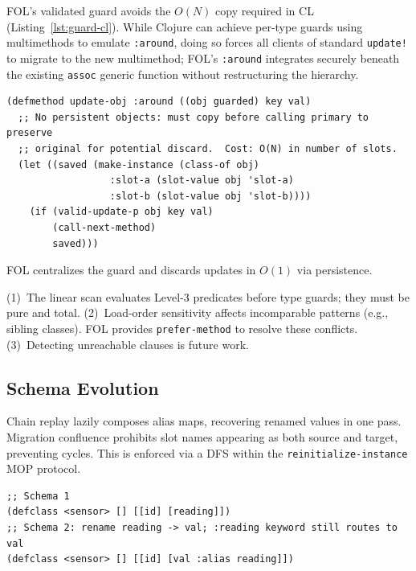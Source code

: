 \documentclass[sigconf,nonacm]{acmart}
\begin{document}
FOL's validated guard avoids the $O(N)$ copy required in CL (Listing~\ref{lst:guard-cl}).
While Clojure can achieve per-type guards using multimethods to emulate \texttt{:around}, doing so forces all clients of standard \texttt{update!} to migrate to the new multimethod;
FOL's \texttt{:around} integrates securely beneath the existing \texttt{assoc} generic function without restructuring the hierarchy.



\begin{lstlisting}[caption={Validated Update Guard in Common Lisp --- requires explicit copy},
                   label={lst:guard-cl}, breaklines=false]
(defmethod update-obj :around ((obj guarded) key val)
  ;; No persistent objects: must copy before calling primary to preserve
  ;; original for potential discard.  Cost: O(N) in number of slots.
  (let ((saved (make-instance (class-of obj)
                  :slot-a (slot-value obj 'slot-a)
                  :slot-b (slot-value obj 'slot-b))))
    (if (valid-update-p obj key val)
        (call-next-method)
        saved)))
\end{lstlisting}

\noindent FOL centralizes the guard and discards updates in $O(1)$ via persistence.

(1)~The linear scan evaluates Level-3 predicates before type guards; they must be pure and total.
(2)~Load-order sensitivity affects incomparable patterns (e.g., sibling classes).
FOL provides \texttt{prefer-method} to resolve these conflicts.
(3)~Detecting unreachable clauses is future work.

\subsection{Schema Evolution}
\label{sec:schema-evolution}
Chain replay lazily composes alias maps, recovering renamed values in one pass.
Migration confluence prohibits slot names appearing as both source and target, preventing cycles.
This is enforced via a DFS within the \texttt{reinitialize-instance} MOP protocol.

\begin{lstlisting}[caption={Lazy Schema Migration with Aliasing}, label={lst:lazy-migration}, breaklines=false]
;; Schema 1
(defclass <sensor> [] [[id] [reading]])
;; Schema 2: rename reading -> val; :reading keyword still routes to val
(defclass <sensor> [] [[id] [val :alias reading]])
\end{lstlisting}
\end{document}

